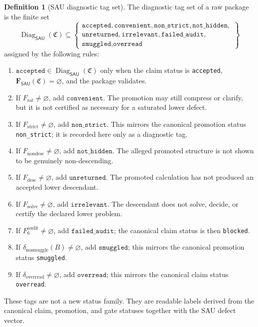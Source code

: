 \documentclass[11pt]{article}
\newcommand{\SAU}{\mathsf{SAU}}
\theoremstyle{definition}
\newtheorem{definition}[theorem]{Definition}
\begin{document}
\begin{definition}[SAU diagnostic tag set]
\label{def:sau-diagnostic-tag-set}
The diagnostic tag set of a raw package is the finite set
\[
\operatorname{Diag}_{\SAU}(\mathfrak C)\subseteq
\left\{
\begin{gathered}
\texttt{accepted},\texttt{convenient},\texttt{non\_strict},\texttt{not\_hidden},\\
\texttt{unreturned},\texttt{irrelevant},\texttt{failed\_audit},\\
\texttt{smuggled},\texttt{overread}
\end{gathered}
\right\}
\]
assigned by the following rules:
\begin{enumerate}
\item \(\texttt{accepted}\in\operatorname{Diag}_{\SAU}(\mathfrak C)\) only when the claim status is \texttt{accepted}, \(\mathbf F_{\SAU}(\mathfrak C)=\varnothing\), and the package validates.
\item If \(F_{\mathrm{sat}}\neq\varnothing\), add \(\texttt{convenient}\).  The promotion may still compress or clarify, but it is not certified as necessary for a saturated lower defect.
\item If \(F_{\mathrm{strict}}\neq\varnothing\), add \(\texttt{non\_strict}\).  This mirrors the canonical promotion status \texttt{non\_strict}; it is recorded here only as a diagnostic tag.
\item If \(F_{\mathrm{nondesc}}\neq\varnothing\), add \(\texttt{not\_hidden}\).  The alleged promoted structure is not shown to be genuinely non-descending.
\item If \(F_{\mathrm{desc}}\neq\varnothing\), add \(\texttt{unreturned}\).  The promoted calculation has not produced an accepted lower descendant.
\item If \(F_{\mathrm{solve}}\neq\varnothing\), add \(\texttt{irrelevant}\).  The descendant does not solve, decide, or certify the declared lower problem.
\item If \(F_6^{\mathrm{audit}}\neq\varnothing\), add \(\texttt{failed\_audit}\); the canonical claim status is then \texttt{blocked}.
\item If \(\delta_{\mathrm{nosmuggle}}(B)\neq\varnothing\), add \(\texttt{smuggled}\); this mirrors the canonical promotion status \texttt{smuggled}.
\item If \(\delta_{\mathrm{overread}}\neq\varnothing\), add \(\texttt{overread}\); this mirrors the canonical claim status \texttt{overread}.
\end{enumerate}
These tags are not a new status family.  They are readable labels derived from the canonical claim, promotion, and gate statuses together with the SAU defect vector.
\end{definition}
\end{document}
